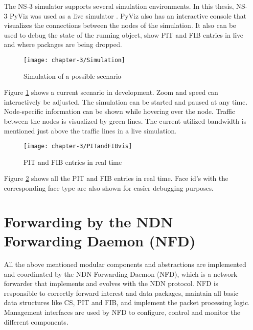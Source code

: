 The NS-3 simulator supports several simulation environments. In this thesis, NS-3 PyViz was used as a live simulator \cite{pyviz}. PyViz also has an interactive console that visualizes the connections between the nodes of the simulation. It also can be used to debug the state of the running object, show PIT and FIB entries in live and where packages are being dropped.

\begin{figure}[H]
  \centering
  \texttt{[image: chapter-3/Simulation]}
  \caption{Simulation of a possible scenario}
  \label{fig:Simulation}
\end{figure}

Figure \ref{fig:Simulation} shows a current scenario in development. Zoom and speed can interactively be adjusted. The simulation can be started and paused at any time. Node-specific information can be shown while hovering over the node. Traffic between the nodes is visualized by green lines. The current utilized bandwidth is mentioned just above the traffic lines in a live simulation.

\begin{figure}[H]
  \centering
  \texttt{[image: chapter-3/PITandFIBvis]}
  \caption{PIT and FIB entries in real time}
  \label{fig:PITandFIBvis}
\end{figure}

Figure \ref{fig:PITandFIBvis} shows all the PIT and FIB entries in real time. Face id's with the corresponding face type are also shown for easier debugging purposes.

\section{Forwarding by the NDN Forwarding Daemon (NFD)}

\vspace{5mm} %

All the above mentioned modular components and abstractions are implemented and coordinated by the NDN Forwarding Daemon (NFD), which is a network forwarder that implements and evolves with the NDN protocol. NFD is responsible to correctly forward interest and data packages, maintain all basic data structures like CS, PIT and FIB, and implement the packet processing logic. Management interfaces are used by NFD to configure, control and monitor the different components.

\vspace{5mm} %


